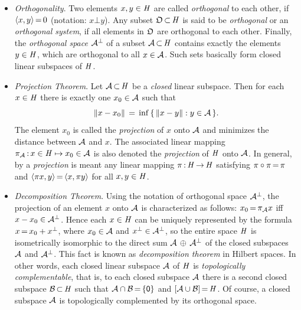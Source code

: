 \documentclass[11pt,twoside]{article}
\begin{document}
\begin{itemize}[leftmargin=4mm,itemsep=6pt]
\item[1.] \textit{Orthogonality}.
Two elements $x,y \in \mathit{H}$ are called \textit{orthogonal} to each other,
if $\langle x,y \rangle {\,=\,} 0$ (notation: $x \bot y$).
Any subset $\mathfrak{O} {\,\subset\,} \mathit{H}$ is said to be \textit{orthogonal}
or an \textit{orthogonal system},
if all elements in $\mathfrak{O}$ are orthogonal to each other.
Finally,
the \textit{orthogonal space} $\mathcal{A}^{\bot}$
of a subset $\mathcal{A} {\,\subset\,} \mathit{H}$ contains exactly the elements $y \in \mathit{H}$,
which are orthogonal to all $x \in \mathcal{A}$.
Such sets basically form closed linear subspaces of $\mathit{H}$.

\item[2.] \textit{Projection Theorem}.
Let $\mathcal{A} {\,\subset\,} \mathit{H}$ be a \textit{closed} linear subspace.
Then for each $x \in \mathit{H}$ there is exactly one $x_0 \in \mathcal{A}$
such that
\[
\left\lVert  x - x_0  \right\rVert \,=\, \inf \, \{ \, \left\lVert x-y \right\rVert: y \in \mathcal{A} \,\}.
\]
The element $x_0$ is called the \textit{projection} of $x$ onto $\mathcal{A}$
and minimizes the distance between $\mathcal{A}$ and $x$.
The associated linear mapping
$\pi_{\mathcal{A}}{\,:\,}x \in \mathit{H} \mapsto x_0 \in \mathcal{A}$
is also denoted the \textit{projection} of $\mathit{H}$ onto $\mathcal{A}$.
In general,
by a \textit{projection} is meant
any linear mapping $\pi{\,:\,}\mathit{H} {\,\to\,} \mathit{H}$ satisfying
$\pi \circ \pi {\,=\,} \pi$ and
$\langle \pi x,y \rangle {\,=\,} \langle x,\pi y \rangle$ for all $x,y \in \mathit{H}$.

\item[3.] \textit{Decomposition Theorem}.
Using the notation of orthogonal space $\mathcal{A}^{\bot}$,
the projection of an element $x$ onto $\mathcal{A}$ is characterized as follows:
$x_0 {\,=\,} \pi_{\mathcal{A}} x$ iff $x-x_0 \in \mathcal{A}^{\bot}$.
Hence each $x \in \mathit{H}$ can be uniquely represented by the formula
$x {\,=\,} x_0 + x^{\bot}$,
where $x_0 \in \mathcal{A}$ and $x^{\bot} \in \mathcal{A}^{\bot}$,
so the entire space $\mathit{H}$ is isometrically isomorphic
to the direct sum $\mathcal{A} \, \oplus \, \mathcal{A}^{\bot}$
of the closed subspaces $\mathcal{A}$ and $\mathcal{A}^{\bot}$.
This fact is known as \textit{decomposition theorem} in Hilbert spaces.
In other words,
each closed linear subspace $\mathcal{A}$ of $\mathit{H}$
is \textit{topologically complementable},
that is,
to each closed subspace $\mathcal{A}$
there is a second closed subspace $\mathcal{B} {\,\subset\,} \mathit{H}$
such that $\mathcal{A} \cap \mathcal{B} {\,=\,} \{{\mathsf{0}}\}$ and $[\mathcal{A} \cup \mathcal{B}] {\,=\,} \mathit{H}$.
Of course,
a closed subspace ${\mathcal{A}}$ is topologically complemented
by its orthogonal space. %


\end{itemize}
\end{document}
